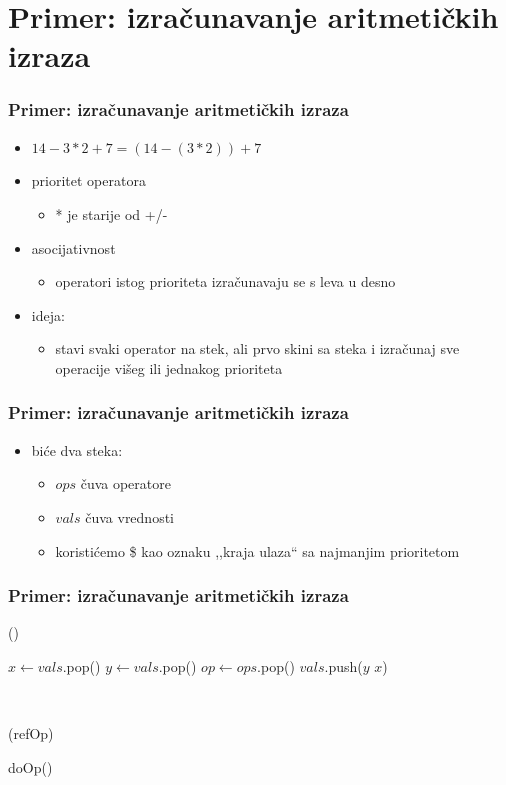 \documentclass[compress]{beamer}
\begin{document}
\section[P: Izrazi]{Primer: izračunavanje aritmetičkih izraza}
\begin{frame}[fragile]
  \frametitle{Primer: izračunavanje aritmetičkih izraza}
  \begin{itemize}
    \item $14 - 3 * 2 + 7 = (14 - (3 * 2)) + 7$
    \item prioritet operatora
    \begin{itemize}
      \item * je starije od +/-
    \end{itemize}
    \item asocijativnost
    \begin{itemize}
      \item operatori istog prioriteta izračunavaju se s leva u desno
    \end{itemize}
    \item ideja:
    \begin{itemize}
      \item stavi svaki operator na stek, ali prvo skini sa steka i izračunaj 
      sve operacije višeg ili jednakog prioriteta
    \end{itemize}
  \end{itemize}
\end{frame}

\begin{frame}[fragile]
  \frametitle{Primer: izračunavanje aritmetičkih izraza}
  \begin{itemize}
    \item biće dva steka:
    \begin{itemize}
      \item $ops$ čuva operatore
      \item $vals$ čuva vrednosti
      \item koristićemo \$ kao oznaku ,,kraja ulaza`` sa najmanjim prioritetom
    \end{itemize}
  \end{itemize}
\end{frame}

\begin{frame}[fragile]
  \frametitle{Primer: izračunavanje aritmetičkih izraza}
()
\begin{algorithmic}
\STATE $x \leftarrow vals$.pop()
\STATE $y \leftarrow vals$.pop()
\STATE $op \leftarrow ops$.pop()
\STATE $vals$.push($y$  $x$)
\end{algorithmic}

\ %

(refOp)
\begin{algorithmic}
  \STATE doOp()
\ENDWHILE
\end{algorithmic}
\end{frame}
\end{document}
